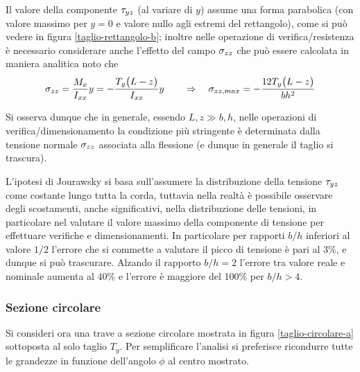 		Il valore della componente $\tau_{yz}$ (al variare di $y$) assume una forma parabolica (con valore massimo per $y=0$ e valore nullo agli estremi del rettangolo), come si può vedere in figura \ref{taglio-rettangolo-b}; inoltre nelle operazione di verifica/resistenza è necessario considerare anche l'effetto del campo $\sigma_{zz}$ che può essere calcolata in maniera analitica noto che
		\[ \sigma_{zz} = \frac {M_x} {I_{xx}} y = -\frac{T_y\big( L-z \big)}{I_{xx}} y \qquad \Rightarrow \quad \sigma_{zz,max}= - \frac{12T_y\big( L-z \big) }{bh^2}\]
		
		Si osserva dunque che in generale, essendo $L,z \gg b,h$, nelle operazioni di verifica/dimensionamento la condizione più stringente è determinata dalla tensione normale $\sigma_{zz}$ associata alla flessione (e dunque in generale il taglio si trascura).
		
		
		L'ipotesi di Jourawsky si basa sull'assumere la distribuzione della tensione $\tau_{yz}$ come costante lungo tutta la corda, tuttavia nella realtà è possibile osservare degli scostamenti, anche significativi, nella distribuzione delle tensioni, in particolare nel valutare il valore massimo della componente di tensione per effettuare verifiche e dimensionamenti. In particolare per rapporti $b/h$ inferiori al valore $1/2$ l'errore che si commette a valutare il picco di tensione è pari al $3\%$, e dunque si può trascurare. Alzando il rapporto $b/h = 2$ l'errore tra valore reale e nominale aumenta al $40\%$ e l'errore è maggiore del $100\%$ per $b/h>4$.
		
	\subsubsection{Sezione circolare}
		Si consideri ora una trave a sezione circolare mostrata in figura \ref{taglio-circolare-a} sottoposta al solo taglio $T_y$. Per semplificare l'analisi si preferisce ricondurre tutte le grandezze in funzione dell'angolo $\phi$ al centro mostrato.
		
